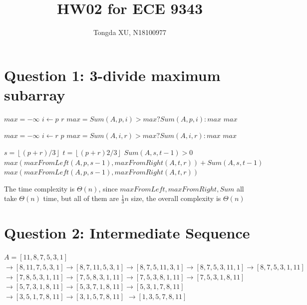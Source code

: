 \documentclass[]{article}
\title{HW02 for ECE 9343}
\author{Tongda XU, N18100977}
\begin{document}
\maketitle

\section{Question 1: 3-divide maximum subarray}

\begin{codebox}
	\li $max = -\infty$
	\li \For $i \gets p$ \To $r$
	\li		\Do $max = Sum(A,p,i)>max?Sum(A,p,i):max$
 		\End
	\li \Return $max$
\end{codebox}

\begin{codebox}
	\li $max = -\infty$
	\li \For $i \gets r$ \Downto $p$
	\li		\Do $max = Sum(A,i,r)>max?Sum(A,i,r):max$
	\End
	\li \Return $max$
\end{codebox}

\begin{codebox}
	\li $s = \left \lfloor (p+r)/3 \right \rfloor$
	\li $t = \left \lfloor (p+r)2/3 \right \rfloor$
	\li \If $Sum(A,s,t-1) > 0$
	\li 	\Then \Return $max(maxFromLeft(A, p, s-1), maxFromRight(A, t, r)) + Sum(A,s,t-1)$
	\li	\Else \Return $max(maxFromLeft(A, p, s-1), maxFromRight(A, t, r))$
	\End
\end{codebox}

The time complexity is $\Theta(n)$, since $maxFromLeft, maxFromRight, Sum$ all take $\Theta(n)$ time, but all of them are $\frac{1}{3}n$ size, the overall complexity is $\Theta(n)$

\section{Question 2: Intermediate Sequence}

\begin{codebox}
	\li $A = [11, 8, 7, 5, 3, 1] $
	\li $\rightarrow [8, 11, 7, 5, 3, 1] \rightarrow [8, 7, 11, 5, 3, 1] \rightarrow [8, 7, 5, 11, 3, 1] 
	\rightarrow [8, 7, 5, 3, 11, 1] \rightarrow [8, 7, 5, 3, 1, 11]$
	\li $\rightarrow [7, 8, 5, 3, 1, 11] \rightarrow [7, 5, 8, 3, 1, 11] \rightarrow [7, 5, 3, 8, 1, 11]\rightarrow [7, 5, 3, 1, 8, 11]$
	\li $\rightarrow [5, 7, 3, 1, 8, 11] \rightarrow [5, 3, 7, 1, 8, 11] \rightarrow [5, 3, 1, 7, 8, 11]$	
	\li $\rightarrow [3, 5, 1, 7, 8, 11]\rightarrow [3, 1, 5, 7, 8, 11] $
	\li $\rightarrow [1, 3, 5, 7, 8, 11]$
\end{codebox}
\end{document}
